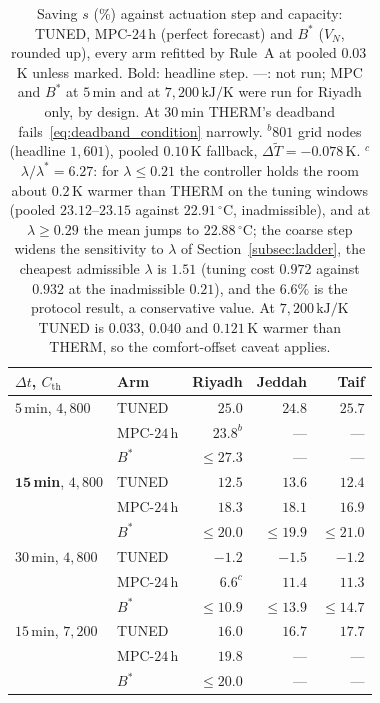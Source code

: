 \documentclass[3p,twocolumn,number]{elsarticle}
\newcommand{\Cth}{C_{\mathrm{th}}}
\begin{document}
\begin{table}[t]
\centering
\caption{Saving $s$ (\%) against actuation step and capacity: TUNED, MPC-$24\,$h
(perfect forecast) and $B^\ast$ ($V_N$, rounded up), every arm refitted by
Rule~A at pooled $0.03\,$K unless marked. Bold: headline step. ---: not run;
MPC and $B^\ast$ at $5\,$min and at $7{,}200\,\text{kJ/K}$ were run for
Riyadh only, by design. At $30\,$min THERM's deadband fails~\eqref{eq:deadband_condition}
narrowly.
$^{b}$$801$ grid nodes (headline $1{,}601$), pooled $0.10\,$K fallback,
$\Delta\tilde T=-0.078\,$K. $^{c}$$\lambda/\lambda^\ast=6.27$: for
$\lambda\le0.21$ the controller holds the room about $0.2\,$K warmer than THERM
on the tuning windows (pooled $23.12$--$23.15$ against $22.91\,^\circ$C,
inadmissible), and at $\lambda\ge0.29$ the mean jumps to $22.88\,^\circ$C; the
coarse step widens the sensitivity to $\lambda$ of Section~\ref{subsec:ladder}, the cheapest
admissible $\lambda$ is $1.51$ (tuning cost $0.972$ against $0.932$ at the
inadmissible $0.21$), and the $6.6\%$ is the protocol result, a conservative
value. At $7{,}200\,\text{kJ/K}$ TUNED is $0.033$, $0.040$ and $0.121\,$K
warmer than THERM, so the comfort-offset caveat applies.}
\label{tab:timestep}
\setlength{\tabcolsep}{2pt}
\footnotesize
\begin{tabular*}{\columnwidth}{@{\extracolsep{\fill}}llrrr@{}}
\toprule
$\Delta t$, $\Cth$ & Arm & Riyadh & Jeddah & Taif \\
\midrule
$5\,$min, $4{,}800$ & TUNED & $25.0$ & $24.8$ & $25.7$ \\
 & MPC-$24\,$h & $23.8^{b}$ & --- & --- \\
 & $B^\ast$ & $\le27.3$ & --- & --- \\
$\mathbf{15}\,$\textbf{min}, $4{,}800$ & TUNED & $12.5$ & $13.6$ & $12.4$ \\
 & MPC-$24\,$h & $18.3$ & $18.1$ & $16.9$ \\
 & $B^\ast$ & $\le20.0$ & $\le19.9$ & $\le21.0$ \\
$30\,$min, $4{,}800$ & TUNED & $-1.2$ & $-1.5$ & $-1.2$ \\
 & MPC-$24\,$h & $6.6^{c}$ & $11.4$ & $11.3$ \\
 & $B^\ast$ & $\le10.9$ & $\le13.9$ & $\le14.7$ \\
$15\,$min, $7{,}200$ & TUNED & $16.0$ & $16.7$ & $17.7$ \\
 & MPC-$24\,$h & $19.8$ & --- & --- \\
 & $B^\ast$ & $\le20.0$ & --- & --- \\
\bottomrule
\end{tabular*}
\end{table}
\end{document}
